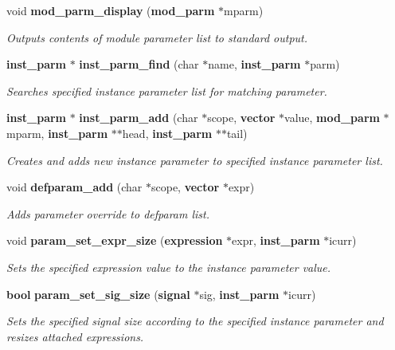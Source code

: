 \begin{CompactItemize}
void {\bf mod\_\-parm\_\-display} ({\bf mod\_\-parm} $\ast$mparm)
\begin{CompactList}\small\item\em Outputs contents of module parameter list to standard output. \item\end{CompactList}\item 
{\bf inst\_\-parm} $\ast$ {\bf inst\_\-parm\_\-find} (char $\ast$name, {\bf inst\_\-parm} $\ast$parm)
\begin{CompactList}\small\item\em Searches specified instance parameter list for matching parameter. \item\end{CompactList}\item 
{\bf inst\_\-parm} $\ast$ {\bf inst\_\-parm\_\-add} (char $\ast$scope, {\bf vector} $\ast$value, {\bf mod\_\-parm} $\ast$mparm, {\bf inst\_\-parm} $\ast$$\ast$head, {\bf inst\_\-parm} $\ast$$\ast$tail)
\begin{CompactList}\small\item\em Creates and adds new instance parameter to specified instance parameter list. \item\end{CompactList}\item 
void {\bf defparam\_\-add} (char $\ast$scope, {\bf vector} $\ast$expr)
\begin{CompactList}\small\item\em Adds parameter override to defparam list. \item\end{CompactList}\item 
void {\bf param\_\-set\_\-expr\_\-size} ({\bf expression} $\ast$expr, {\bf inst\_\-parm} $\ast$icurr)
\begin{CompactList}\small\item\em Sets the specified expression value to the instance parameter value. \item\end{CompactList}\item 
{\bf bool} {\bf param\_\-set\_\-sig\_\-size} ({\bf signal} $\ast$sig, {\bf inst\_\-parm} $\ast$icurr)
\begin{CompactList}\small\item\em Sets the specified signal size according to the specified instance parameter and resizes attached expressions. \item\end{CompactList}\item 

\end{CompactItemize}
